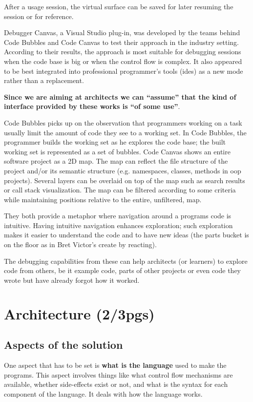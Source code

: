 \documentclass{./llncs2e/llncs}
\begin{document}
	After a usage session, the virtual surface can be saved for later resuming the session or for reference.

	Debugger Canvas, a Visual Studio plug-in, was developed by the teams behind Code Bubbles and Code Canvas to test their approach in the industry setting. 
	According to their results, the approach is most suitable for debugging sessions when the code base is big or when the control flow is complex. 
	It also appeared to be best integrated into professional programmer's tools (\ac{ide}s) as a new mode rather than a replacement.

	\textbf{Since we are aiming at architects we can ``assume'' that the kind of interface provided by these works is ``of some use''}.

	Code Bubbles picks up on the observation that programmers working on a task usually limit the amount of code they see to a working set. 
	In Code Bubbles, the programmer builds the working set as he explores the code base; the built working set is represented as a set of bubbles.
	Code Canvas shows an entire software project as a 2D map.
	The map can reflect the file structure of the project and/or its semantic structure (e.g. namespaces, classes, methods in \ac{oop} projects). Several layers can be overlaid on top of the map such as search results or call stack visualization. The map can be filtered according to some criteria while maintaining positions relative to the entire, unfiltered, map.

	They both provide a metaphor where navigation around a programs code is intuitive. 
	Having intuitive navigation enhances exploration; such exploration makes it easier to understand the code and to have new ideas (the parts bucket is on the floor as in Bret Victor's create by reacting).

	The debugging capabilities from these can help architects (or learners) to explore code from others, be it example code, parts of other projects or even code they wrote but have already forgot how it worked.

\section{Architecture (2/3pgs)}

\subsection{Aspects of the solution}
	One aspect that has to be set is \textbf{what is the language} used to make the programs.
	This aspect involves things like what control flow mechanisms are available, whether side-effects exist or not, and what is the syntax for each component of the language.
	It deals with how the language works.
\end{document}
